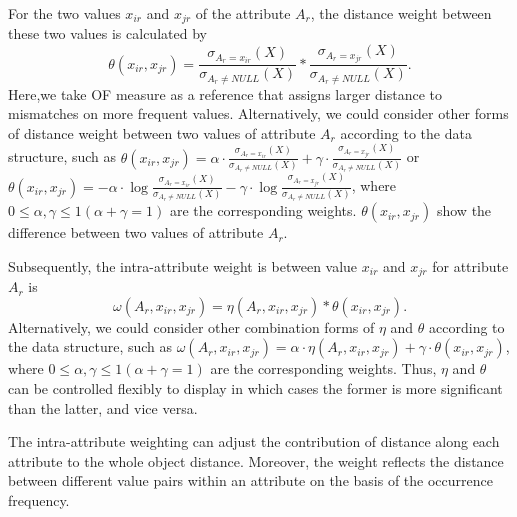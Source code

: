 \documentclass[review]{elsarticle}
\begin{document}
For the two values $x_{ir}$ and $x_{jr}$ of the attribute $A_r$, the distance weight between these two values is calculated by
\begin{equation}
\theta(x_{ir},x_{jr}) = \frac{\sigma_{A_r = x_{ir}}(X)}{\sigma_{A_r \neq NULL}(X)} * \frac{\sigma_{A_r = x_{jr}}(X)}{\sigma_{A_r \neq NULL}(X)}.
\label{equ8}
\end{equation}
Here,we take OF measure as a reference that assigns larger distance to mismatches on more frequent values. Alternatively, we could consider other forms of distance weight between two values of attribute $A_r$ according to the data structure, such as $\theta(x_{ir},x_{jr}) = \alpha \cdot \frac{\sigma_{A_r = x_{ir}}(X)}{\sigma_{A_r \neq NULL}(X)} + \gamma \cdot \frac{\sigma_{A_r = x_{jr}}(X)}{\sigma_{A_r \neq NULL}(X)}$ or $\theta(x_{ir},x_{jr}) = -\alpha \cdot \log{\frac{\sigma_{A_r = x_{ir}}(X)}{\sigma_{A_r \neq NULL}(X)}} - \gamma \cdot \log{\frac{\sigma_{A_r = x_{jr}}(X)}{\sigma_{A_r \neq NULL}(X)}}$, where $0 \leq \alpha,\gamma \leq 1 (\alpha+\gamma = 1)$ are the corresponding weights. $\theta(x_{ir},x_{jr})$ show the difference between two values of attribute $A_r$.

Subsequently, the intra-attribute weight is between value $x_{ir}$ and $x_{jr}$ for attribute $A_r$ is
\begin{equation}
\label{equ9}
\omega(A_r,x_{ir},x_{jr})= \eta(A_r,x_{ir},x_{jr}) * \theta(x_{ir},x_{jr}).
\end{equation}
Alternatively, we could consider other combination forms of $\eta$ and $\theta$ according to the data structure, such as $\omega(A_r,x_{ir},x_{jr})= \alpha \cdot \eta(A_r,x_{ir},x_{jr}) + \gamma \cdot \theta(x_{ir},x_{jr})$, where $0 \leq \alpha,\gamma \leq 1 (\alpha+\gamma = 1)$ are the corresponding weights. Thus, $\eta$ and $\theta$ can be controlled flexibly to display in which cases the former is more significant than the latter, and vice versa.

The intra-attribute weighting can adjust the contribution of distance along each attribute to the whole object distance. Moreover, the weight reflects the distance between different value pairs within an attribute on the basis of the occurrence frequency.
\end{document}
